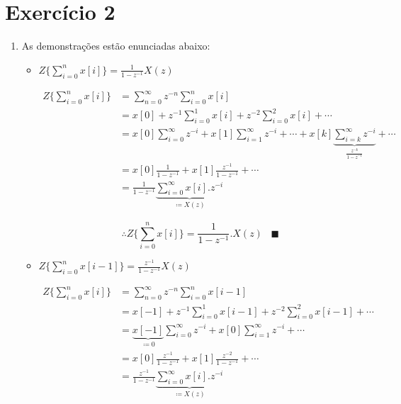 \documentclass{article}
\begin{document}
\section*{Exercício 2}

\begin{enumerate}
\item %

As demonstrações estão enunciadas abaixo:

\begin{itemize}
	\item $Z\{\sum_{i=0}^{n}x[i] \} = \frac{1}{1-z^{-1}}X(z)$
	
	\begin{equation}
	\begin{split}
	Z\{\sum_{i=0}^{n}x[i] \} & = \sum_{n=0}^{\infty} z^{-n} \sum_{i=0}^{n} x[i] \\
	& = x[0] + z^{-1} \sum_{i=0}^{1} x[i] + z^{-2} \sum_{i=0}^{2} x[i] + \cdots \\
	& = x[0] \sum_{i=0}^{\infty} z^{-i} + x[1] \sum_{i=1}^{\infty} z^{-i} + \cdots + x[k] 
	\underbrace{\sum_{i=k}^{\infty} z^{-i}}_{\frac{z^{-k}}{1 - z^{-1}}} + \cdots\\
	& = x[0] \frac{1}{1 - z^{-1}} + x[1] \frac{z^{-1}}{1 - z^{-1}} + \cdots \\
	& = \frac{1}{1 - z^{-1}} \underbrace{\sum_{i=0}^{\infty} x[i].z^{-i}}_{\coloneqq X(z)}
	\end{split}
	\end{equation}

	\begin{equation}
	\therefore Z\{\sum_{i=0}^{n}x[i] \} = \frac{1}{1-z^{-1}}.X(z) \hspace{10pt} \blacksquare
	\end{equation}
	
	\item $Z\{\sum_{i=0}^{n}x[i-1] \} = \frac{z^{-1}}{1-z^{-1}}X(z)$

	\begin{equation}
	\begin{split}
	Z\{\sum_{i=0}^{n}x[i] \} & = \sum_{n=0}^{\infty} z^{-n} \sum_{i=0}^{n} x[i-1] \\
	& = x[-1] + z^{-1} \sum_{i=0}^{1} x[i-1] + z^{-2} \sum_{i=0}^{2} x[i-1] + \cdots \\
	& = \underbrace{x[-1]}_{\coloneqq 0} \sum_{i=0}^{\infty} z^{-i} + x[0] \sum_{i=1}^{\infty} z^{-i} + \cdots \\
	& = x[0] \frac{z^{-1}}{1 - z^{-1}} + x[1] \frac{z^{-2}}{1 - z^{-1}} + \cdots \\
	& = \frac{z^{-1}}{1 - z^{-1}} \underbrace{\sum_{i=0}^{\infty} x[i].z^{-i}}_{\coloneqq X(z)}
	\end{split}
	\end{equation}


\end{itemize}
\end{enumerate}
\end{document}

